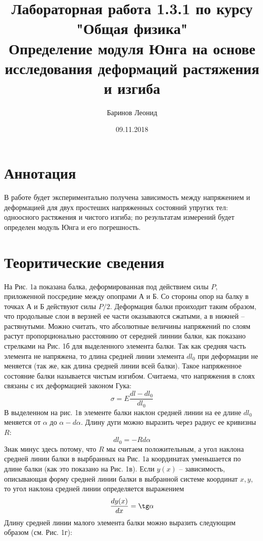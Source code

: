 \documentclass[a4paper,12pt]{article} %
\title{Лабораторная работа 1.3.1 по курсу \\ "Общая физика"  \\ 
\vspace{0.2cm}
\vspace{4.5cm}
 \LARGE{\textbf{Определение модуля Юнга на основе исследования деформаций растяжения и изгиба}}\vspace{5.5cm}}
\date{09.11.2018}
\author{\vspace{0.2cm}Баринов Леонид}
\begin{document}
\maketitle
\newpage
\section{Аннотация}
В работе будет экспериментально получена зависимость между напряжением и деформацией для двух простеших напряженных состояний упругих тел: одноосного растяжения и чистого изгиба; по результатам измерений будет определен модуль Юнга и его погрешность.
\section{Теоритические сведения}
На Рис. 1а показана балка, деформированная под действием силы $P$, приложенной поссредине между опопрами А и Б. Со стороны опор на балку в точках А и Б действуют силы $P/2$. Деформация балки проиходит таким образом, что продольные слои в верзней ее части оказываются сжатыми, а в нижней -- растянутыми. Можно считать, что абсолютные величины напряжений по слоям растут пропорционально расстоянию от середней линнии балки, как показано стрелками на Рис. 1б для выделенного элемента балки. Так как средняя часть элемента не напряжена, то длина средней линии элемента $dl_0$ при деформации не меняется (так же, как длина средней линии всей балки). Такое напряженное состояние балки называется чистым изгибом. Считаема, что напряжения в слоях связаны с их деформацией законом Гука:
\begin{equation}
\sigma = E\frac{dl - dl_0}{dl_0}
\end{equation}
В выделенном на рис. 1в элементе балки наклон средней линии на ее длине $dl_0$ меняется от $\alpha$ до $\alpha-d\alpha$. Длину дуги можно выразить через радиус ее кривизны $R$:
\begin{equation}
dl_0 = -Rd\alpha
\end{equation}
Знак минус здесь потому, что $R$ мы считаем положительным, а угол наклона средней линии балки в вырбранных на Рис. 1а координатах уменьшается по длине балки (как это показано на Рис. 1в). Если $y(x)$ -- зависимость, описывающая форму средней линии балки в выбранной системе координат $x, y$, то угол наклона средней линии определяется выражением
\begin{equation}
\frac{dy(x)}{dx} = \tg\alpha
\end{equation}
Длину средней линии малого элемента балки можно выразить следующим образом (см. Рис. 1г):
\end{document}
